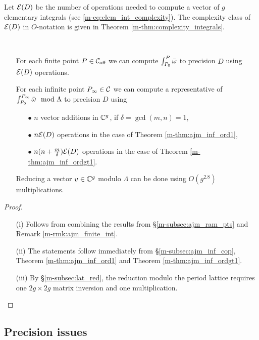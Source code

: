 \documentclass[main.tex]{subfiles}
\begin{document}
  Let $\mathcal E(D)$ be the number of operations needed to compute a vector of $g$ elementary integrals  (see \eqref{m-eq:elem_int_complexity}). The complexity class of $\mathcal E(D)$ in $O$-notation is given in
  Theorem \ref{m-thm:complexity_integrals}.

   \begin{thm} \
   \begin{itemize}
     \item[{\upshape{(i)}}] For each finite point $P \in \mathcal{C}_{\text{aff}}$ we can compute $\int_{P_0}^P \bar{\omega}$ to precision $D$ using
      $\mathcal E(D)$ operations.
     \item[{\upshape{(ii)}}] For each infinite point $P_{\infty} \in \mathcal{C}$ we can compute a representative of $\int_{P_0}^{P_{\infty}} \bar{\omega} \mod \Lambda$ to precision $D$ using
      \begin{itemize}
       \item[$\bullet$] $n$ vector additions in $\mathbb{C}^g$, if $\delta = \gcd(m,n) = 1$,
       \item[$\bullet$] $n \mathcal E(D)$ operations in the case of Theorem \ref{m-thm:ajm_inf_ord1},
       \item[$\bullet$] $n(n+\frac{m}\delta)\mathcal E(D)$ operations  in the case of Theorem \ref{m-thm:ajm_inf_ordgt1}.
      \end{itemize}
      \item[{\upshape{(iii)}}] Reducing a vector $v \in \mathbb{C}^g$ modulo $\Lambda$ can be done using $O(g^{2.8})$ multiplications.
    \end{itemize}
  \end{thm}
   \begin{proof}
    \begin{itemize}
     \item[(i)] Follows from combining the results from \S \ref{m-subsec:ajm_ram_pts} and Remark \ref{m-rmk:ajm_finite_int}.
     \item[(ii)] The statements follow immediately from \S \ref{m-subsec:ajm_inf_cop}, Theorem \ref{m-thm:ajm_inf_ord1} and Theorem \ref{m-thm:ajm_inf_ordgt1}.
     \item[(iii)] By \S \ref{m-subsec:lat_red}, the reduction modulo the period lattice requires one $2g \times 2g$ matrix inversion and one multiplication.
    \end{itemize}
   \end{proof}

   \subsection{Precision issues}
\end{document}
